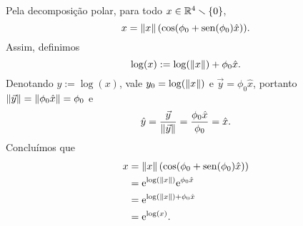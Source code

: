 Pela decomposição polar, para todo $x \in \mathbb{R}^4 \smallsetminus \{0\}$,
	\begin{equation*}
	x = \left\Vert{x}\right\Vert(\cos(\phi_0 + \operatorname{sen}(\phi_0)\hat{x})).
	\end{equation*}
Assim, definimos
	\begin{equation*}
	\log(x) := \log(\left\Vert{x}\right\Vert) + \phi_0 \hat{x}.
	\end{equation*}
Denotando $y := \log(x)$, vale ${y}_0 = \log(\left\Vert{x}\right\Vert)$ e $\vec{y}=\phi_0 \hat{x}$, portanto $\left\Vert{\vec{y}}\right\Vert = \left\Vert{\phi_0\hat{x}}\right\Vert = \phi_0$ e
	\begin{equation*}
	\hat{y} = \frac{\vec{y}}{\left\Vert{\vec{y}}\right\Vert} = \frac{\phi_0 \hat{x}}{\phi_0} = \hat{x}.
	\end{equation*}
Concluímos que
	\begin{align*}
	x &= \left\Vert{x}\right\Vert(\cos(\phi_0 + \operatorname{sen}(\phi_0)\hat{x})) \\
		&= \mathrm{e}^{\log(\left\Vert{x}\right\Vert)}\mathrm{e}^{\phi_0 \hat{x}} \\
		&= \mathrm{e}^{\log(\left\Vert{x}\right\Vert) + \phi_0 \hat{x}} \\
		&= \mathrm{e}^{\log(x)}.
	\end{align*}